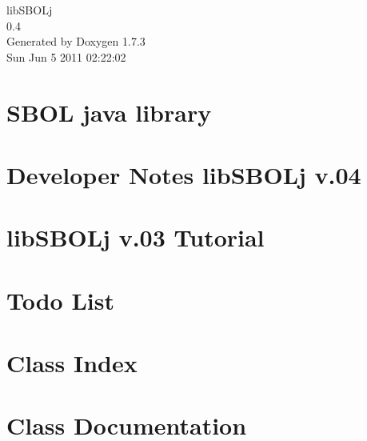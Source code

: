 \documentclass[a4paper]{book}
\begin{document}
\hypersetup{pageanchor=false}
\begin{titlepage}
\vspace*{7cm}
\begin{center}
{\Large libSBOLj \\[1ex]\large 0.4 }\\
\vspace*{1cm}
{\large Generated by Doxygen 1.7.3}\\
\vspace*{0.5cm}
{\small Sun Jun 5 2011 02:22:02}\\
\end{center}
\end{titlepage}
\clearemptydoublepage
{}
\tableofcontents
\clearemptydoublepage
{}
\hypersetup{pageanchor=true}
\chapter{SBOL java library}
\label{index}\hypertarget{index}{}
\chapter{Developer Notes libSBOLj v.04}
\label{devnotes}
\hypertarget{devnotes}{}

\chapter{libSBOLj v.03 Tutorial}
\label{tutorial}
\hypertarget{tutorial}{}

\chapter{Todo List}
\label{todo}
\hypertarget{todo}{}

\chapter{Class Index}

\chapter{Class Documentation}















\printindex
\end{document}
